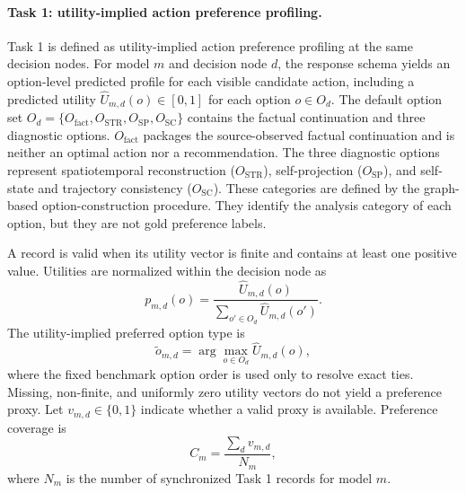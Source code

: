 \documentclass[pdflatex,sn-mathphys-num]{sn-jnl}%
\theoremstyle{thmstyleone}%
\theoremstyle{thmstyletwo}%
\theoremstyle{thmstylethree}%
\begin{document}
\paragraph{Task 1: utility-implied action preference profiling.}
Task 1 is defined as utility-implied action preference profiling at the same decision nodes. For model $m$ and decision node $d$, the response schema yields an option-level predicted profile for each visible candidate action, including a predicted utility $\widehat U_{m,d}(o)\in[0,1]$ for each option $o\in O_d$. The default option set $O_d=\{O_{\mathrm{fact}},O_{\mathrm{STR}},O_{\mathrm{SP}},O_{\mathrm{SC}}\}$ contains the factual continuation and three diagnostic options. $O_{\mathrm{fact}}$ packages the source-observed factual continuation and is neither an optimal action nor a recommendation. The three diagnostic options represent spatiotemporal reconstruction ($O_{\mathrm{STR}}$), self-projection ($O_{\mathrm{SP}}$), and self-state and trajectory consistency ($O_{\mathrm{SC}}$). These categories are defined by the graph-based option-construction procedure. They identify the analysis category of each option, but they are not gold preference labels.

A record is valid when its utility vector is finite and contains at least one positive value. Utilities are normalized within the decision node as
\begin{equation}
p_{m,d}(o)=\frac{\widehat U_{m,d}(o)}{\sum_{o'\in O_d}\widehat U_{m,d}(o')}.
\end{equation}
The utility-implied preferred option type is
\begin{equation}
\widetilde o_{m,d}=\arg\max_{o\in O_d}\widehat U_{m,d}(o),
\end{equation}
where the fixed benchmark option order is used only to resolve exact ties. Missing, non-finite, and uniformly zero utility vectors do not yield a preference proxy. Let $v_{m,d}\in\{0,1\}$ indicate whether a valid proxy is available. Preference coverage is
\begin{equation}
C_m=\frac{\sum_d v_{m,d}}{N_m},
\end{equation}
where $N_m$ is the number of synchronized Task 1 records for model $m$.
\end{document}
